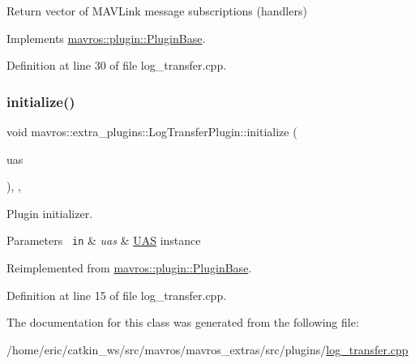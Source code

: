 Return vector of M\+A\+V\+Link message subscriptions (handlers) 



Implements \mbox{\hyperlink{group__plugin_gaf4e23fec6d7436a62cbf0942a2e5791c}{mavros\+::plugin\+::\+Plugin\+Base}}.



Definition at line 30 of file log\+\_\+transfer.\+cpp.

\mbox{\label{classmavros_1_1extra__plugins_1_1LogTransferPlugin_a9b51f52d0ba0538c8dc08b79e35b42f8}} 
\subsubsection{\texorpdfstring{initialize()}{initialize()}}
{\footnotesize\ttfamily void mavros\+::extra\+\_\+plugins\+::\+Log\+Transfer\+Plugin\+::initialize (\begin{DoxyParamCaption}\item[{\mbox{\hyperlink{classmavros_1_1UAS}{U\+AS}} \&}]{uas }\end{DoxyParamCaption})\hspace{0.3cm}{\ttfamily [inline]}, {\ttfamily [override]}, {\ttfamily [virtual]}}



Plugin initializer. 


\begin{DoxyParams}[1]{Parameters}
\mbox{\texttt{ in}}  & {\em uas} & {\ttfamily \mbox{\hyperlink{classmavros_1_1UAS}{U\+AS}}} instance \\
\hline
\end{DoxyParams}


Reimplemented from \mbox{\hyperlink{group__plugin_gad5313a41da4d26acbbabf008cdc21e82}{mavros\+::plugin\+::\+Plugin\+Base}}.



Definition at line 15 of file log\+\_\+transfer.\+cpp.



The documentation for this class was generated from the following file\+:\begin{DoxyCompactItemize}
\item 
/home/eric/catkin\+\_\+ws/src/mavros/mavros\+\_\+extras/src/plugins/\mbox{\hyperlink{log__transfer_8cpp}{log\+\_\+transfer.\+cpp}}\end{DoxyCompactItemize}
